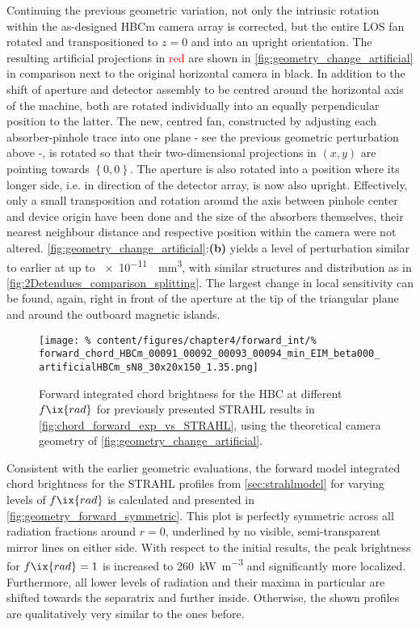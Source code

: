             Continuing the previous geometric variation, not only the intrinsic rotation within the as-designed HBCm camera array is corrected, but the entire LOS fan rotated and transpositioned to $z=0$ and into an upright orientation. The resulting artificial projections in \textcolor{red}{red} are shown in \cref{fig:geometry_change_artificial} in comparison next to the original horizontal camera in black. In addition to the shift of aperture and detector assembly to be centred around the horizontal axis of the machine, both are rotated individually into an equally perpendicular position to the latter. The new, centred fan, constructed by adjusting each absorber-pinhole trace into one plane - see the previous geometric perturbation above -, is rotated so that their two-dimensional projections in $\left(x,y\right)$ are pointing towards $\left\{0,0\right\}$. The aperture is also rotated into a position where its longer side, i.e. in direction of the detector array, is now also upright. Effectively, only a small transposition and rotation around the axis between pinhole center and device origin have been done and the size of the absorbers themselves, their nearest neighbour distance and respective position within the camera were not altered. \autoref{fig:geometry_change_artificial}:\textbf{(b)} yields a level of perturbation similar to earlier at up to \SI[per-mode=reciprocal]{e-11}{\per\cubic\milli\meter}, with similar structures and distribution as in \cref{fig:2Detendues_comparison_splitting}. The largest change in local sensitivity can be found, again, right in front of the aperture at the tip of the triangular plane and around the outboard magnetic islands.\\%
%
            \begin{figure}[t]%
                \centering%
                \texttt{[image: \%
                    content/figures/chapter4/forward\_int/\%
                    forward\_chord\_HBCm\_00091\_00092\_00093\_00094\_min\_EIM\_beta000\_artificialHBCm\_sN8\_30x20x150\_1.35.png]}%
                \caption{Forward integrated chord brightness for the HBC at different $f\ix{rad}$ for previously presented STRAHL results in \cref{fig:chord_forward_exp_vs_STRAHL}, using the theoretical camera geometry of \cref{fig:geometry_change_artificial}.}\label{fig:forward_intSTRAHL_artificial}%
            \end{figure}%
%
            Consistent with the earlier geometric evaluations, the forward model integrated chord brightness for the STRAHL profiles from \cref{sec:strahlmodel} for varying levels of $f\ix{rad}$ is calculated and presented in \cref{fig:geometry_forward_symmetric}. This plot is perfectly symmetric across all radiation fractions around $r=0$, underlined by no visible, semi-transparent mirror lines on either side. With respect to the initial results, the peak brightness for $f\ix{rad}=1$ is increased to \SI{260}{\kilo\watt\per\cubic\meter} and significantly more localized. Furthermore, all lower levels of radiation and their maxima in particular are shifted towards the separatrix and further inside. Otherwise, the shown profiles are qualitatively very similar to the ones before.\\%
%
